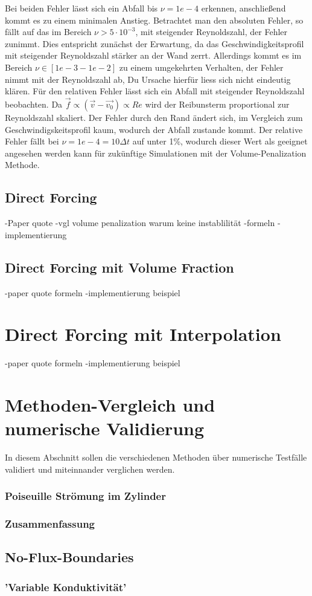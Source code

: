 Bei beiden Fehler lässt sich ein Abfall bis $\nu=1e-4$ erkennen, anschließend kommt es zu einem minimalen Anstieg.
Betrachtet man den absoluten Fehler, so fällt auf das im Bereich $\nu>5\cdot10^{-3}$, mit steigender Reynoldszahl, der Fehler zunimmt.
Dies entspricht zunächst der Erwartung, da das Geschwindigkeitsprofil mit steigender Reynoldszahl stärker an der Wand zerrt.
Allerdings kommt es im Bereich $\nu \in [1e-3 - 1e-2]$ zu einem umgekehrten Verhalten, der Fehler nimmt mit der Reynoldszahl ab,
Du Ursache hierfür liess sich nicht eindeutig klären.
Für den relativen Fehler lässt sich ein Abfall mit steigender Reynoldszahl beobachten. Da $\vec{f} \propto (\vec{v}-\vec{v_0})  \propto Re$ wird der Reibunsterm
proportional zur Reynoldszahl skaliert. Der Fehler durch den Rand ändert sich, im Vergleich zum Geschwindigskeitsprofil kaum, wodurch der Abfall zustande kommt.
Der relative Fehler fällt bei $\nu=1e-4=10\Delta t$ auf unter 1\%, wodurch dieser Wert als geeignet angesehen werden kann für zukünftige Simulationen mit der Volume-Penalization Methode.


\subsection{Direct Forcing}
-Paper quote
-vgl volume penalization warum keine instablilität
-formeln
-implementierung

\subsection{Direct Forcing mit Volume Fraction}
-paper quote formeln
-implementierung beispiel

\section{Direct Forcing mit Interpolation}
-paper quote formeln
-implementierung beispiel

\section{Methoden-Vergleich und numerische Validierung}
In diesem Abschnitt sollen die verschiedenen Methoden über numerische Testfälle validiert und miteinnander
verglichen werden.


\subsubsection{Poiseuille Strömung im Zylinder}

\subsubsection{Zusammenfassung}


\subsection{No-Flux-Boundaries}

\subsubsection{'Variable Konduktivität'}










